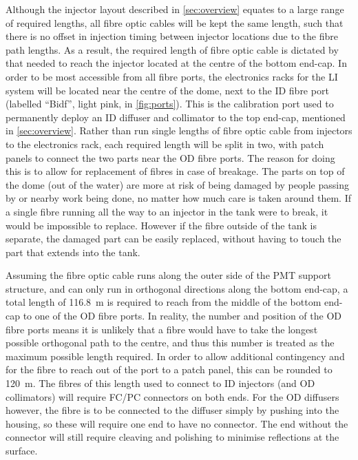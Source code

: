 \documentclass[a4paper,11pt]{article}
\begin{document}
Although the injector layout described in \cref{sec:overview} equates to a large range of required lengths, all fibre optic cables will be kept the same length, such that there is no offset in injection timing between injector locations due to the fibre path lengths. As a result, the required length of fibre optic cable is dictated by that needed to reach the injector located at the centre of the bottom end-cap. In order to be most accessible from all fibre ports, the electronics racks for the LI system will be located near the centre of the dome, next to the ID fibre port (labelled ``Bidf'', light pink, in \cref{fig:ports}). This is the calibration port used to permanently deploy an ID diffuser and collimator to the top end-cap, mentioned in \cref{sec:overview}. Rather than run single lengths of fibre optic cable from injectors to the electronics rack, each required length will be split in two, with patch panels to connect the two parts near the OD fibre ports. The reason for doing this is to allow for replacement of fibres in case of breakage. The parts on top of the dome (out of the water) are more at risk of being damaged by people passing by or nearby work being done, no matter how much care is taken around them. If a single fibre running all the way to an injector in the tank were to break, it would be impossible to replace. However if the fibre outside of the tank is separate, the damaged part can be easily replaced, without having to touch the part that extends into the tank.

Assuming the fibre optic cable runs along the outer side of the PMT support structure, and can only run in orthogonal directions along the bottom end-cap, a total length of 116.8~m is required to reach from the middle of the bottom end-cap to one of the OD fibre ports. In reality, the number and position of the OD fibre ports means it is unlikely that a fibre would have to take the longest possible orthogonal path to the centre, and thus this number is treated as the maximum possible length required. In order to allow additional contingency and for the fibre to reach out of the port to a patch panel, this can be rounded to 120~m. The fibres of this length used to connect to ID injectors (and OD collimators) will require FC/PC connectors on both ends. For the OD diffusers however, the fibre is to be connected to the diffuser simply by pushing into the housing, so these will require one end to have no connector. The end without the connector will still require cleaving and polishing to minimise reflections at the surface.
\end{document}
